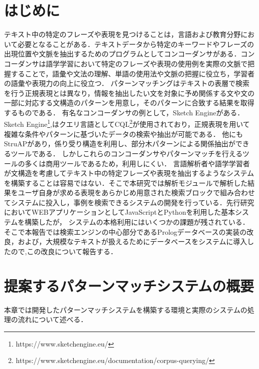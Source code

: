 \documentclass{FITpaper}
\begin{document}
\maketitle

\section{はじめに}
テキスト中の特定のフレーズや表現を見つけることは，言語および教育分野において必要となることがある．テキストデータから特定のキーワードやフレーズの出現位置や文脈を抽出するためのプログラムとしてコンコーダンサがある．コンコーダンサは語学学習において特定のフレーズや表現の使用例を実際の文脈で把握することで，語彙や文法の理解、単語の使用法や文脈の把握に役立ち，学習者の語彙や表現力の向上に役立つ．
パターンマッチングはテキストの表層で検索を行う正規表現とは異なり，情報を抽出したい文を対象に予め関係する文や文の一部に対応する文構造のパターンを用意し，そのパターンに合致する結果を取得するものである．
有名なコンコーダンサの例として，Sketch Engineがある．Sketch Engine\footnote{https://www.sketchengine.eu/},はクエリ言語としてCQL\footnote{https://www.sketchengine.eu/documentation/corpus-querying/}が使用されており，正規表現を用いて複雑な条件やパターンに基づいたデータの検索や抽出が可能である．
他にもStruAP\cite{struAP:2017}があり，係り受り構造を利用し、部分木パターンによる関係抽出ができるツールである．
しかしこれらのコンコーダンサやパターンマッチを行えるツールの多くは商用ツールであるため，利用しにくい．
言語解析者や語学学習者が文構造を考慮してテキスト中の特定フレーズや表現を抽出するようなシステムを構築することは容易ではない．そこで本研究では解析モジュールで解析した結果をユーザ自身が求める表現をあらかじめ用意された検索ブロックで組み合わせてシステムに投入し，事例を検索できるシステムの開発を行っている．先行研究\cite{okada:2022}\cite{ogasawara:2022}においてWEBアプリケーションとしてJavaScriptとPythonを利用した基本システムを構築したが，
システムの本格利用にはいくつかの課題が残されている．そこで本報告では検索エンジンの中心部分であるPrologデータベースの実装の改良，および，大規模なテキストが扱えるためにデータベースをシステムに導入したので,この改良について報告する．


\section{提案するパターンマッチシステムの概要}
本章では開発したパターンマッチシステムを構築する環境と実際のシステムの処理の流れについて述べる．
\end{document}
